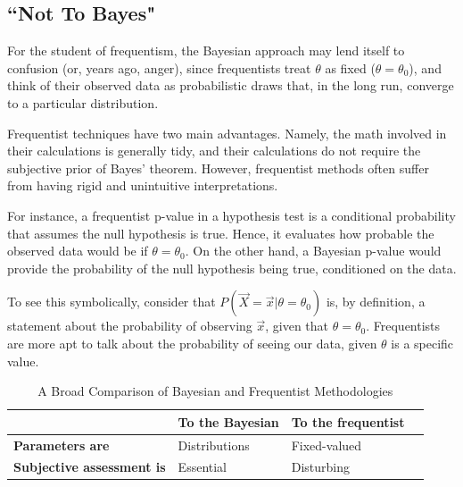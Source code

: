 \documentclass[12pt,twoside]{reedthesis}
\begin{document}
	\subsection*{``Not To Bayes"}
	For the student of frequentism, the Bayesian approach may lend itself to confusion (or, years ago, anger), since frequentists treat $\theta$ as fixed ($\theta = \theta_0$), and think of their observed data as probabilistic draws that, in the long run, converge to a particular distribution.
	
	Frequentist techniques have two main advantages. Namely, the math involved in their calculations is generally tidy, and their calculations do not require the subjective prior of Bayes' theorem. However, frequentist methods often suffer from having rigid and unintuitive interpretations. 
	
	For instance, a frequentist p-value in a hypothesis test is a conditional probability that assumes the null hypothesis is true. Hence, it evaluates how probable the observed data would be if $\theta = \theta_0$. On the other hand, a Bayesian p-value would provide the probability of the null hypothesis being true, conditioned on the data. 
	
	To see this symbolically, consider that $P(\vec{X} = \vec{x} | \theta = \theta_0 )$ is, by definition, a statement about the probability of observing $\vec{x}$, given that $\theta = \theta_0$. Frequentists are more apt to talk about the probability of seeing our data, given $\theta$ is a specific value.

\begin{table}[htdp] %
\caption[Comparison of Bayesian and Frequentist Reasoning]{A Broad Comparison of Bayesian and Frequentist Methodologies} 
\begin{center}
\begin{tabular}{l l l l} 

   &  \textbf{To the Bayesian} & \textbf{To the frequentist} \\ %
  \midrule %
\textbf{Parameters are} & Distributions  & Fixed-valued \\ %
\textbf{Subjective assessment is} & Essential & Disturbing \\
\bottomrule %
\end{tabular}
\end{center}
\label{bvf} %
\end{table}
\end{document}
